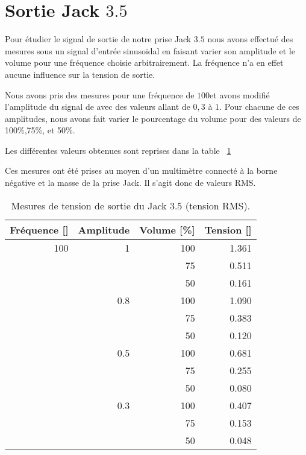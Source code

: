 \section{Sortie Jack $3.5$\milli \meter}

Pour étudier le signal de sortie de notre prise Jack $3.5$ \milli \meter nous avons effectué des mesures sous un signal d'entrée sinusoïdal en faisant varier
son amplitude et le volume pour une fréquence choisie arbitrairement. La fréquence n'a en effet aucune influence sur la tension de sortie. 

Nous avons pris des mesures pour une fréquence de $100$\hertz et avons modifié l'amplitude du signal de avec des valeurs allant de $0,3$ à $1$. Pour chacune de ces amplitudes, nous avons fait varier le pourcentage du volume pour des valeurs de 100\%,75\%, et 50\%.

Les différentes valeurs obtenues sont reprises dans la table ~\ref{tab : Sortie Jack} 

Ces mesures ont été prises au moyen d'un multimètre connecté à la borne négative et la masse de la prise Jack. Il s'agit donc de valeurs RMS.




\begin{table}
\begin{center}
\begin{tabular}{|r|r|r|r|}
\hline

	Fréquence [\hertz] & Amplitude & Volume [\%] & Tension [\volt] \\
\hline
		100 & 1 & 100 & 1.361 \\
	 	& & 75 & 0.511 \\
	 	& & 50 & 0.161 \\
	 \cline{2-4}
		 & 0.8 & 100 & 1.090 \\
		 \cline{3-5}
		 & & 75 & 0.383 \\
		  \cline{3-5}
		 & & 50 & 0.120 \\
	 \cline{2-4}
	 	& 0.5 & 100 & 0.681\\
		 \cline{3-5}
	 	& & 75 & 0.255 \\
		 \cline{3-5}
	 	& & 50 & 0.080 \\
	 \cline{2-4}
	 	& 0.3 & 100 & 0.407 \\
		 \cline{3-5}
	 	& & 75 & 0.153 \\
		 \cline{3-5}
	 	& & 50 & 0.048 \\
\hline
\end{tabular}
\end{center}
\caption{Mesures de tension de sortie du Jack $3.5$ \milli \meter (tension RMS).}
\label{tab : Sortie Jack}
\end{table}
